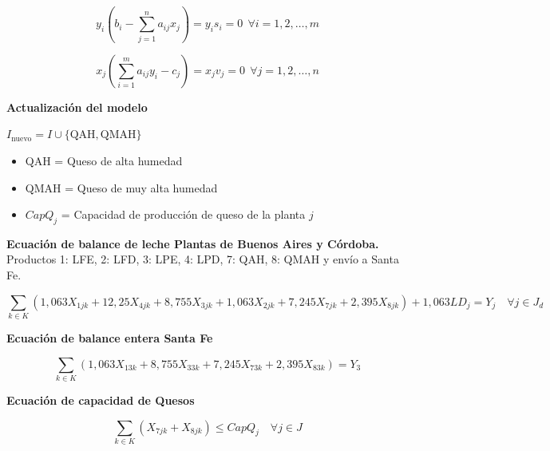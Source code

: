 \documentclass{article}
\begin{document}
\[
y_i(b_i-\sum_{j=1}^{n}a_{ij}x_j) = y_is_i = 0 \:\: \forall i = 1, 2, \dots, m
\]

\[
x_j(\sum_{i=1}^{m}a_{ij}y_i - c_j) = x_jv_j = 0 \:\: \forall j = 1, 2, \dots, n
\]

\newpage

\textbf{Actualización del modelo}

$I_{\text{nuevo}} = I \cup \{\text{QAH}, \text{QMAH}\}$

\begin{itemize}
    \item QAH = Queso de alta humedad
    \item QMAH = Queso de muy alta humedad
    \item $CapQ_j$ = Capacidad de producción de queso de la planta $j$
\end{itemize}

\textbf{Ecuación de balance de leche Plantas de Buenos Aires y Córdoba.} Productos 1: LFE, 2: LFD, 3: LPE, 4: LPD, 7: QAH, 8: QMAH y envío a Santa Fe.

$$\sum_{k \in K} (1{,}063 X_{1jk} + 12{,}25 X_{4jk} + 8{,}755 X_{3jk} + 1{,}063 X_{2jk} + 7{,}245 X_{7jk} + 2{,}395 X_{8jk}) + 1{,}063 LD_j = Y_j \quad \forall j \in J_d$$

\textbf{Ecuación de balance entera Santa Fe}

$$\sum_{k \in K} (1{,}063 X_{13k} + 8{,}755 X_{33k} + 7{,}245 X_{73k} + 2{,}395 X_{83k}) = Y_3$$

\textbf{Ecuación de capacidad de Quesos}

$$\sum_{k \in K} (X_{7jk} + X_{8jk}) \le CapQ_j \quad \forall j \in J$$
\end{document}
